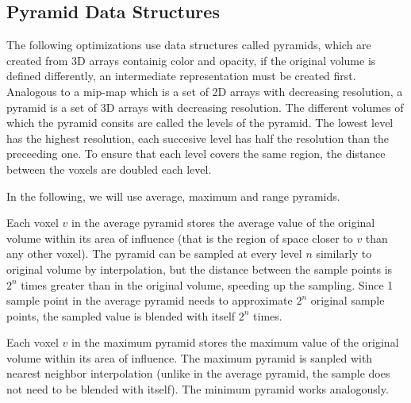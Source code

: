 \subsection{Pyramid Data Structures}
The following optimizations use data structures called pyramids, which are created from 3D arrays containig color and opacity, if the original volume is defined differently, an intermediate representation must be created first.
Analogous to a mip-map which is a set of 2D arrays with decreasing resolution, a pyramid is a set of 3D arrays with decreasing resolution. The different volumes of which the pyramid consits are called the levels of the pyramid. The lowest level has the highest resolution, each succesive level has half the resolution than the preceeding one. To ensure that each level covers the same region, the distance between the voxels are doubled each level.

In the following, we will use average, maximum and range pyramids.

Each voxel $v$ in the average pyramid stores the average value of the original volume within its area of influence (that is the region of space closer to $v$ than any other voxel).
The pyramid can be sampled at every level $n$ similarly to original volume  by interpolation, but the distance between the sample points is $2^n$ times greater than in the original volume, speeding up the sampling.
Since 1 sample point in the average pyramid needs to approximate $2^n$ original sample points, the sampled value is blended with itself $2^n$ times.


Each voxel $v$ in the maximum pyramid stores the maximum value of the original volume within its area of influence.
The maximum pyramid is sanpled with nearest neighbor interpolation (unlike in the average pyramid, the sample does not need to be blended with itself).
The minimum pyramid works analogously.

